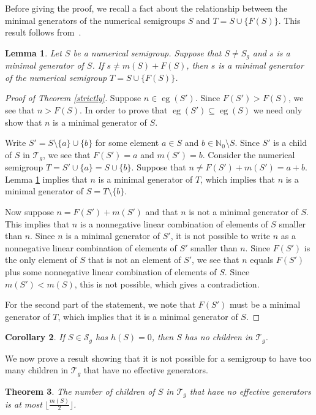\documentclass[12pt]{amsart}
\DeclareMathOperator{\eg}{eg}
\newcommand{\N}{{\mathbb N}}
\newcommand{\T}{{\mathcal T}}
\theoremstyle{plain}\newtheorem{proposition}{Proposition}[section]
\newtheorem{theorem}[proposition]{Theorem}
\newtheorem{cor}[proposition]{Corollary}
\newtheorem{lemma}[proposition]{Lemma}
\begin{document}
Before giving the proof, we recall a fact about the relationship between the minimal generators of the numerical semigroups $S$ and $T = S \cup \{F(S)\}$.  This result follows from~\cite[Lemma 3]{Bras-Amoros_towards}.
\begin{lemma}\label{Lem:min_gens}
Let $S$ be a numerical semigroup.  Suppose that $S \neq S_g$ and $s$ is a minimal generator of $S$.  If $s \neq m(S)+F(S)$, then $s$ is a minimal generator of the numerical semigroup $T = S \cup \{F(S)\}$.
\end{lemma}

\begin{proof}[Proof of Theorem \ref{strictly}]
Suppose $n \in \eg(S')$.  Since $F(S') > F(S)$, we see that $n > F(S)$.  In order to prove that $\eg(S') \subseteq \eg(S)$ we need only show that $n$ is a minimal generator of $S$.

Write $S' = S \setminus \{a\} \cup \{b\}$ for some element $a \in S$ and $b \in \N_0 \setminus S$.  Since $S'$ is a child of $S$ in $\T_g$, we see that $F(S') = a$ and $m(S') = b$.  Consider the numerical semigroup $T = S' \cup \{a\} = S \cup \{b\}$.  Suppose that $n \neq F(S')+m(S') = a+b$.  Lemma \ref{Lem:min_gens} implies that $n$ is a minimal generator of $T$, which implies that $n$ is a minimal generator of $S = T\setminus \{b\}$.

Now suppose $n = F(S')+m(S')$ and that $n$ is not a minimal generator of $S$.  This implies that $n$ is a nonnegative linear combination of elements of $S$ smaller than $n$.  Since $n$ is a minimal generator of $S'$, it is not possible to write $n$ as a nonnegative linear combination of elements of $S'$ smaller than $n$.  Since $F(S')$ is the only element of $S$ that is not an element of $S'$, we see that $n$ equals $F(S')$ plus some nonnegative linear combination of elements of $S$.  Since $m(S') < m(S)$, this is not possible, which gives a contradiction.

For the second part of the statement, we note that $F(S')$ must be a minimal generator of $T$, which implies that it is a minimal generator of $S$.
\end{proof}

\begin{cor}
If $S \in \mathcal{S}_g$ has $h(S) = 0$, then $S$ has no children in $\T_g$.
\end{cor}


We now prove a result showing that it is not possible for a semigroup to have too many children in $\T_g$ that have no effective generators.
\begin{theorem}\label{Thm:children_h0}
The number of children of $S$ in $\T_g$ that have no effective generators is at most $\big\lfloor \frac{m(S)}{2}\big\rfloor$.
\end{theorem}
\end{document}
